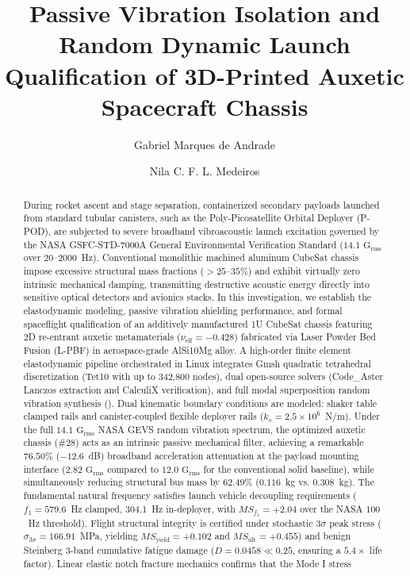 \documentclass[preprint,12pt,3p]{elsarticle}
\newcommand{\code}[1]{\texttt{\detokenize{#1}}}
\begin{document}
\begin{frontmatter}

\title{Passive Vibration Isolation and Random Dynamic Launch Qualification of 3D-Printed Auxetic Spacecraft Chassis}

\author[uesc]{Gabriel Marques de Andrade}

\author[uesc]{Nila C. F. L. Medeiros}

\address[uesc]{Department of Exact and Technological Sciences, State University of Santa Cruz (UESC), Rodovia Jorge Amado km 16, Ilh\'eus, BA 45662-900, Brazil}

\begin{abstract}
During rocket ascent and stage separation, containerized secondary payloads launched from standard tubular canisters, such as the Poly-Picosatellite Orbital Deployer (P-POD), are subjected to severe broadband vibroacoustic launch excitation governed by the NASA GSFC-STD-7000A General Environmental Verification Standard ($14.1\text{ G}_{\text{rms}}$ over $20\text{--}2000$~Hz). Conventional monolithic machined aluminum CubeSat chassis impose excessive structural mass fractions ($>25\text{--}35\%$) and exhibit virtually zero intrinsic mechanical damping, transmitting destructive acoustic energy directly into sensitive optical detectors and avionics stacks. In this investigation, we establish the elastodynamic modeling, passive vibration shielding performance, and formal spaceflight qualification of an additively manufactured 1U CubeSat chassis featuring 2D re-entrant auxetic metamaterials ($\nu_{\text{eff}} = -0.428$) fabricated via Laser Powder Bed Fusion (L-PBF) in aerospace-grade AlSi10Mg alloy. A high-order finite element elastodynamic pipeline orchestrated in Linux integrates Gmsh quadratic tetrahedral discretization (Tet10 with up to 342,800 nodes), dual open-source solvers (Code\_Aster Lanczos extraction and CalculiX verification), and full modal superposition random vibration synthesis (\code{DYNA_ALEA_MODAL}). Dual kinematic boundary conditions are modeled: shaker table clamped rails and canister-coupled flexible deployer rails ($k_s = 2.5 \times 10^6$~N/m). Under the full $14.1\text{ G}_{\text{rms}}$ NASA GEVS random vibration spectrum, the optimized auxetic chassis (\#28) acts as an intrinsic passive mechanical filter, achieving a remarkable $76.50\%$ ($-12.6$~dB) broadband acceleration attenuation at the payload mounting interface ($2.82\text{ G}_{\text{rms}}$ compared to $12.0\text{ G}_{\text{rms}}$ for the conventional solid baseline), while simultaneously reducing structural bus mass by $62.49\%$ ($0.116$~kg vs. $0.308$~kg). The fundamental natural frequency satisfies launch vehicle decoupling requirements ($f_1 = 579.6$~Hz clamped, $304.1$~Hz in-deployer, with $MS_{f_1} = +2.04$ over the NASA $100$~Hz threshold). Flight structural integrity is certified under stochastic $3\sigma$ peak stress ($\sigma_{3\sigma} = 166.91$~MPa, yielding $MS_{\text{yield}} = +0.102$ and $MS_{\text{ult}} = +0.455$) and benign Steinberg 3-band cumulative fatigue damage ($D = 0.0458 \ll 0.25$, ensuring a $5.4\times$ life factor). Linear elastic notch fracture mechanics confirms that the Mode I stress 
\end{abstract}
\end{frontmatter}
\end{document}
